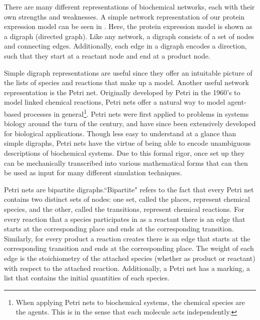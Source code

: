 There are many different representations of biochemical networks, each with their own strengths and weaknesses. A simple network representation of our protein expression model can be seen in . Here, the protein expression model is shown as a digraph (directed graph). Like any network, a digraph consists of a set of nodes and connecting edges. Additionally, each edge in a digraph encodes a direction, such that they start at a reactant node and end at a product node.

Simple digraph representations are useful since they offer an intuitable picture of the lists of species and reactions that make up a model. Another useful network representation is the Petri net. Originally developed by Petri in the 1960's\supercite{Petri:1966vs} to model linked chemical reactions, Petri nets offer a natural way to model agent-based processes in general\footnote{When applying Petri nets to biochemical systems, the chemical species are the agents. This is in the sense that each molecule acts independently.}. Petri nets were first applied to problems in systems biology around the turn of the century\supercite{Goss:1998tf}, and have since been extensively developed for biological applications\supercite{Pinney:2003tz,Hardy:2004tq,Haas:2006ts}. Though less easy to understand at a glance than simple digraphs, Petri nets have the virtue of being able to encode unambiguous descriptions of biochemical systems. Due to this formal rigor, once set up they can be mechanically transcribed into various mathematical forms that can then be used as input for many different simulation techniques.

Petri nets are bipartite digraphs.``Bipartite" refers to the fact that every Petri net contains two distinct sets of nodes: one set, called the places, represent chemical species, and the other, called the transitions, represent chemical reactions. For every reaction that a species participates in as a reactant there is an edge that starts at the corresponding place and ends at the corresponding transition. Similarly, for every product a reaction creates there is an edge that starts at the corresponding transition and ends at the corresponding place. The weight of each edge is the stoichiometry of the attached species (whether as product or reactant) with respect to the attached reaction. Additionally, a Petri net has a marking, a list that contains the initial quantities of each species.


